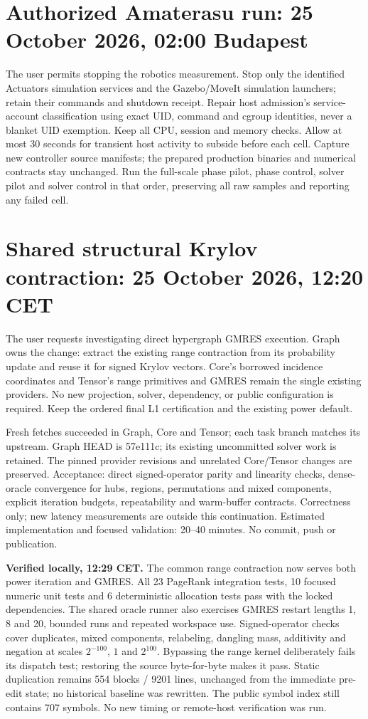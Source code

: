 \documentclass[10pt,a4paper]{article}
\begin{document}
\section*{Authorized Amaterasu run: 25 October 2026, 02:00 Budapest}
The user permits stopping the robotics measurement. Stop only the identified
Actuators simulation services and the Gazebo/MoveIt simulation launchers; retain
their commands and shutdown receipt. Repair host admission's service-account
classification using exact UID, command and cgroup identities, never a blanket
UID exemption. Keep all CPU, session and memory checks. Allow at most 30 seconds
for transient host activity to subside before each cell. Capture new controller
source manifests; the prepared production binaries and numerical contracts stay
unchanged. Run the full-scale phase pilot, phase control, solver pilot and solver
control in that order, preserving all raw samples and reporting any failed cell.
\section*{Shared structural Krylov contraction: 25 October 2026, 12:20 CET}
The user requests investigating direct hypergraph GMRES execution. Graph owns
the change: extract the existing range contraction from its probability update
and reuse it for signed Krylov vectors. Core's borrowed incidence coordinates
and Tensor's range primitives and GMRES remain the single existing providers.
No new projection, solver, dependency, or public configuration is required.
Keep the ordered final L1 certification and the existing power default.

Fresh fetches succeeded in Graph, Core and Tensor; each task branch matches its
upstream. Graph HEAD is 57e111c; its existing uncommitted solver work is retained.
The pinned provider revisions and unrelated Core/Tensor changes are preserved.
Acceptance: direct signed-operator parity and linearity checks, dense-oracle
convergence for hubs, regions, permutations and mixed components, explicit
iteration budgets, repeatability and warm-buffer contracts. Correctness only;
new latency measurements are outside this continuation. Estimated implementation
and focused validation: 20--40 minutes. No commit, push or publication.

\textbf{Verified locally, 12:29 CET.} The common range contraction now serves
both power iteration and GMRES. All 23 PageRank integration tests, 10 focused
numeric unit tests and 6 deterministic allocation tests pass with the locked
dependencies. The shared oracle runner also exercises GMRES restart lengths
1, 8 and 20, bounded runs and repeated workspace use. Signed-operator checks cover
duplicates, mixed components, relabeling, dangling mass, additivity and negation
at scales $2^{-100}$, $1$ and $2^{100}$. Bypassing the range kernel deliberately
fails its dispatch test; restoring the source byte-for-byte makes it pass.
Static duplication remains 554 blocks / 9201 lines, unchanged from the immediate
pre-edit state; no historical baseline was rewritten. The public symbol index
still contains 707 symbols. No new timing or remote-host verification was run.
\end{document}

